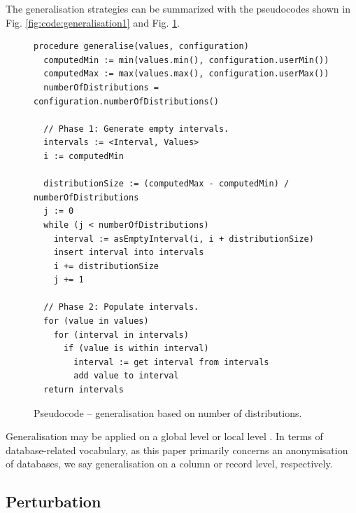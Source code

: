 \documentclass[a4paper,twoside,12pt]{book}
\begin{document}
The generalisation strategies can be summarized with the pseudocodes shown in Fig. \ref{fig:code:generalisation1} and Fig. \ref{fig:code:generalisation2}.

\begin{figure}[h]
\begin{verbatim}
procedure generalise(values, configuration)
  computedMin := min(values.min(), configuration.userMin())
  computedMax := max(values.max(), configuration.userMax())
  numberOfDistributions = configuration.numberOfDistributions()

  // Phase 1: Generate empty intervals.
  intervals := <Interval, Values>
  i := computedMin
  
  distributionSize := (computedMax - computedMin) / numberOfDistributions
  j := 0    
  while (j < numberOfDistributions)
    interval := asEmptyInterval(i, i + distributionSize)
    insert interval into intervals
    i += distributionSize
    j += 1

  // Phase 2: Populate intervals.
  for (value in values)
    for (interval in intervals)
      if (value is within interval)
        interval := get interval from intervals
        add value to interval
  return intervals
\end{verbatim}
\caption{Pseudocode – generalisation based on number of distributions.}
\label{fig:code:generalisation2}
\end{figure}

Generalisation may be applied on a global level or local level \cite{bib:anonymization_extensive_study}. In terms of database-related vocabulary, as this paper primarily concerns an anonymisation of databases, we say generalisation on a column or record level, respectively.

\subsection{Perturbation}
\end{document}
